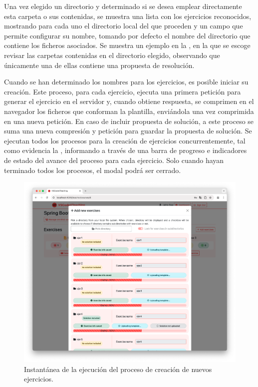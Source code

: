 Una vez elegido un directorio y determinado si se desea emplear directamente esta carpeta o sus contenidas, se muestra una lista con los ejercicios reconocidos, mostrando para cada uno el directorio local del que proceden y un campo que permite configurar su nombre, tomando por defecto el nombre del directorio que contiene los ficheros asociados. Se muestra un ejemplo en la , en la que se escoge revisar las carpetas contenidas en el directorio elegido, observando que únicamente una de ellas contiene una propuesta de resolución.

Cuando se han determinado los nombres para los ejercicios, es posible iniciar su creación. Este proceso, para cada ejercicio, ejecuta una primera petición para generar el ejercicio en el servidor y, cuando obtiene respuesta, se comprimen en el navegador los ficheros que conforman la plantilla, enviándola una vez comprimida en una nueva petición. En caso de incluir propuesta de solución, a este proceso se suma una nueva compresión y petición para guardar la propuesta de solución. Se ejecutan todos los procesos para la creación de ejercicios concurrentemente, tal como evidencia la , informando a través de una barra de progreso e indicadores de estado del avance del proceso para cada ejercicio. Solo cuando hayan terminado todos los procesos, el modal podrá ser cerrado.

\begin{figure}[ht]
    \centering
    \includegraphics[width=\textwidth]{imagenes/utilizadas/4-3-implementacion/rf2-2.png}
    \caption{Instantánea de la ejecución del proceso de creación de nuevos ejercicios.}
    \label{fig:reqf2-2}
\end{figure}
